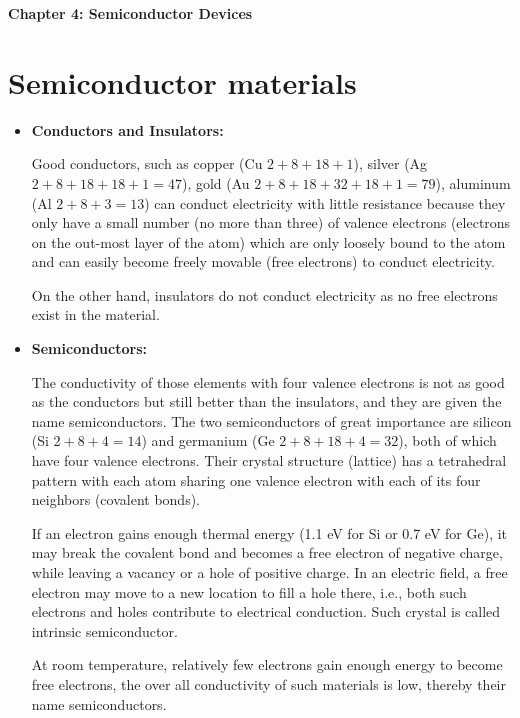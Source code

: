 \usepackage{html}


{\bf Chapter 4: Semiconductor Devices}

\section*{Semiconductor materials}

\begin{itemize}
\item {\bf Conductors and Insulators:} 

Good conductors, such as copper (Cu $2+8+18+1$), silver (Ag $2+8+18+18+1=47$),
gold (Au $2+8+18+32+18+1=79$), aluminum (Al $2+8+3=13$) can conduct electricity 
with little resistance because they only have a small number (no more than 
three) of valence electrons (electrons on the out-most layer of the atom) which
are only loosely bound to the atom and can easily become freely movable (free 
electrons) to conduct electricity.

On the other hand, insulators do not conduct electricity as no free electrons
exist in the material.

\item {\bf Semiconductors:} 

The conductivity of those elements with four valence electrons is not as
good as the conductors but still better than the insulators, and they are
given the name semiconductors. The two semiconductors of great importance 
are silicon (Si $2+8+4=14$) and germanium (Ge $2+8+18+4=32$), both of which 
have four valence electrons. Their crystal structure (lattice) has a tetrahedral
pattern with each atom sharing one valence electron with each of its four 
neighbors (covalent bonds). 

If an electron gains enough thermal energy (1.1 eV for Si or 0.7 eV for
Ge), it may break the covalent bond and becomes a free electron of negative
charge, while leaving a vacancy or a hole of positive charge. In an electric
field, a free electron may move to a new location to fill a hole there, i.e.,
both such electrons and holes contribute to electrical conduction. Such 
crystal is called intrinsic semiconductor.

At room temperature, relatively few electrons gain enough energy to become
free electrons, the over all conductivity of such materials is low, thereby
their name semiconductors. 



\end{itemize}
